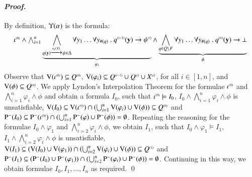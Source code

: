 \paragraph{\em Proof.} By definition, $\Upsilon({\alpha})$ is the formula:
\[\begin{array}{c}
{\iota}^{\scriptscriptstyle{({0})}} \wedge 
 \bigwedge_{i=1}^n \underbrace{\bigwedge_{q(\mathbf y) \xrightarrow{{\scriptscriptstyle a_i(X)}}_{{\scriptstyle }} \psi \in
   \Delta} \forall y_1 \ldots \forall y_{\#(q)} ~.~
 {q}^{\scriptscriptstyle{({i-1})}}(\mathbf y) \rightarrow {\psi}^{\scriptscriptstyle{({i})}}}_{\varphi_i} \wedge
 \underbrace{\bigwedge_{q \in Q \setminus F} \forall y_1 \ldots \forall y_{\#(q)}
 ~.~ {q}^{\scriptscriptstyle{({n})}}(\mathbf y) \rightarrow \bot}_{\phi}
 \end{array}\]
 Observe that $\mathrm{V}({{\iota}^{\scriptscriptstyle{({0})}}}) \subseteq {Q}^{\scriptscriptstyle{({0})}}$,
 $\mathrm{V}({\varphi_i}) \subseteq
 {Q}^{\scriptscriptstyle{({i-1})}}\cup{Q}^{\scriptscriptstyle{({i})}}\cup{X}^{\scriptscriptstyle{({i})}}$, for all $i \in
       [1,n]$, and $\mathrm{V}({\phi}) \subseteq {Q}^{\scriptscriptstyle{({n})}}$.  We apply
       Lyndon's Interpolation Theorem for the formulae
       ${\iota}^{\scriptscriptstyle{({0})}}$ and $\bigwedge_{i=1}^n \varphi_i \wedge
       \phi$ and obtain a formula $I_0$, such that ${\iota}^{\scriptscriptstyle{({0})}}
       \models I_0$, $I_0 \wedge \bigwedge_{i=1}^n \varphi_i \wedge
       \phi$ is unsatisfiable, $\mathrm{V}({I_0}) \subseteq
       \mathrm{V}({{\iota}^{\scriptscriptstyle{({0})}}}) \cap (\bigcup_{i=1}^n \mathrm{V}({\varphi_i})
       \cup \mathrm{V}({\phi})) \subseteq {Q}^{\scriptscriptstyle{({0})}}$ and $\mathrm{P}^{-}(I_0)
       \subseteq \mathrm{P}^{-}({\iota}^{\scriptscriptstyle{({0})}}) \cap (\bigcup_{i=1}^n
       \mathrm{P}^{-}(\varphi) \cup \mathrm{P}^{-}(\phi)) = \emptyset$. Repeating
       the reasoning for the formulae $I_0 \wedge \varphi_1$ and
       $\bigwedge_{i=2}^n \varphi_i \wedge \phi$, we obtain $I_1$,
       such that $I_0 \wedge \varphi_1 \models I_1$, $I_1 \wedge
       \bigwedge_{i=2}^n \varphi_i \wedge \phi$ is unsatisfiable,
       $\mathrm{V}({I_1}) \subseteq (\mathrm{V}({I_0}) \cup \mathrm{V}({\varphi_1})) \cap
       (\bigcup_{i=2}^n \mathrm{V}({\varphi_i}) \cup \mathrm{V}({\phi})) \subseteq
       {Q}^{\scriptscriptstyle{({1})}}$ and $\mathrm{P}^{-}(I_1) \subseteq (\mathrm{P}^{-}(I_0) \cup
       \mathrm{P}^{-}(\varphi_1)) \cap (\bigcup_{i=2}^n \mathrm{P}^{-}(\varphi_i)
       \cup \mathrm{P}^{-}(\phi)) = \emptyset$. Continuing in this way, we
       obtain formulae $I_0, I_1, \ldots, I_{n}$ as required. \qed

